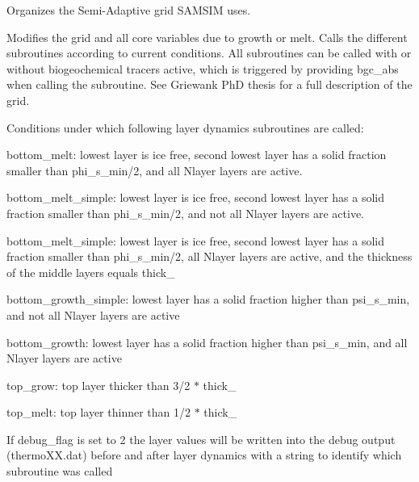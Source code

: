 Organizes the Semi-\/Adaptive grid SAMSIM uses. 

Modifies the grid and all core variables due to growth or melt. Calls the different subroutines according to current conditions. All subroutines can be called with or without biogeochemical tracers active, which is triggered by providing bgc\_\-abs when calling the subroutine. See Griewank PhD thesis for a full description of the grid.

Conditions under which following layer dynamics subroutines are called:
\begin{DoxyItemize}
\item bottom\_\-melt: lowest layer is ice free, second lowest layer has a solid fraction smaller than phi\_\-s\_\-min/2, and all Nlayer layers are active.
\item bottom\_\-melt\_\-simple: lowest layer is ice free, second lowest layer has a solid fraction smaller than phi\_\-s\_\-min/2, and not all Nlayer layers are active.
\item bottom\_\-melt\_\-simple: lowest layer is ice free, second lowest layer has a solid fraction smaller than phi\_\-s\_\-min/2, all Nlayer layers are active, and the thickness of the middle layers equals thick\_
\item bottom\_\-growth\_\-simple: lowest layer has a solid fraction higher than psi\_\-s\_\-min, and not all Nlayer layers are active
\item bottom\_\-growth: lowest layer has a solid fraction higher than psi\_\-s\_\-min, and all Nlayer layers are active
\item top\_\-grow: top layer thicker than 3/2 $\ast$ thick\_
\item top\_\-melt: top layer thinner than 1/2 $\ast$ thick\_
\end{DoxyItemize}

If debug\_\-flag is set to 2 the layer values will be written into the debug output (thermoXX.dat) before and after layer dynamics with a string to identify which subroutine was called

